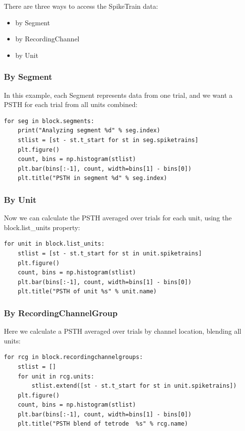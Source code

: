 \documentclass{frontiers}
\begin{document}
There are three ways to access the SpikeTrain data:
\begin{itemize}
\item by Segment
\item by RecordingChannel
\item by Unit
\end{itemize}

\subsubsection{By Segment}

In this example, each Segment represents data from one trial, and we want a PSTH for each trial from all units combined:

\begin{lstlisting}[style=display]
for seg in block.segments:
    print("Analyzing segment %d" % seg.index)
    stlist = [st - st.t_start for st in seg.spiketrains]
    plt.figure()
    count, bins = np.histogram(stlist)
    plt.bar(bins[:-1], count, width=bins[1] - bins[0])
    plt.title("PSTH in segment %d" % seg.index)
\end{lstlisting}

\subsubsection{By Unit}

Now we can calculate the PSTH averaged over trials for each unit, using the block.list\_units property:

\begin{lstlisting}[style=display]
for unit in block.list_units:
    stlist = [st - st.t_start for st in unit.spiketrains]
    plt.figure()
    count, bins = np.histogram(stlist)
    plt.bar(bins[:-1], count, width=bins[1] - bins[0])
    plt.title("PSTH of unit %s" % unit.name)
\end{lstlisting}


\subsubsection{By RecordingChannelGroup}
Here we calculate a PSTH averaged over trials by channel location, blending all units:
\begin{lstlisting}[style=display]
for rcg in block.recordingchannelgroups:
    stlist = []
    for unit in rcg.units:
        stlist.extend([st - st.t_start for st in unit.spiketrains])
    plt.figure()
    count, bins = np.histogram(stlist)
    plt.bar(bins[:-1], count, width=bins[1] - bins[0])
    plt.title("PSTH blend of tetrode  %s" % rcg.name)
\end{lstlisting}
\end{document}
